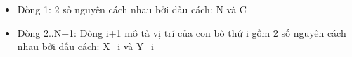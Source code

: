 \begin{itemize}
	\item     Dòng 1: 2 số nguyên cách nhau bởi dấu cách: N và C   
	\item     Dòng 2..N+1: Dòng i+1 mô tả vị trí của con bò thứ i gồm 2 số nguyên cách nhau bởi dấu cách: X\_i và Y\_i   
\end{itemize}